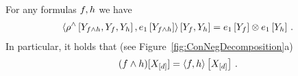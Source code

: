 \begin{theorem}
    \label{the:effectiveConjunction}
    For any formulas $f,h$ we have
    \begin{align*}
        \left\langle 
            \rho^{\land}\left[Y_{f\land h},Y_{f},Y_{h}\right],e_1\left[Y_{f\land h}\right]
        \right\rangle \left[ Y_{f},Y_{h} \right]
        = e_1\left[Y_{f}\right] \otimes e_1\left[Y_{h}\right] \, .
    \end{align*}
    In particular, it holds that (see Figure~\ref{fig:ConNegDecomposition}a)
    \begin{align*}
    (f\land h)[X_{[d]}]
        = \left\langle f,h\right\rangle \left[ X_{[d]} \right] \, .
    \end{align*}
\end{theorem}
